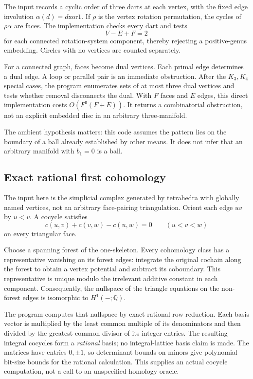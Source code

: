 \documentclass[11pt]{article}
\newcommand{\Q}{\mathbb Q}
\begin{document}
The input records a cyclic order of three darts at each vertex, with the fixed
edge involution $\alpha(d)=d\mathbin{\mathrm{xor}}1$. If $\rho$ is the vertex
rotation permutation, the cycles of $\rho\alpha$ are faces. The implementation
checks every dart and tests
\[
 V-E+F=2
\]
for each connected rotation-system component, thereby rejecting a positive-genus
embedding. Circles with no vertices are counted separately.

For a connected graph, faces become dual vertices. Each primal edge determines
a dual edge. A loop or parallel pair is an immediate obstruction. After the
$K_3,K_4$ special cases, the program enumerates sets of at most three dual
vertices and tests whether removal disconnects the dual. With $F$ faces and
$E$ edges, this direct implementation costs $O(F^3(F+E))$. It returns a
combinatorial obstruction, not an explicit embedded disc in an arbitrary
three-manifold.

The ambient hypothesis matters: this code assumes the pattern lies on the
boundary of a ball already established by other means. It does not infer that
an arbitrary manifold with $b_1=0$ is a ball.

\subsection{Exact rational first cohomology}
The input here is the simplicial complex generated by tetrahedra with globally
named vertices, not an arbitrary face-pairing triangulation. Orient each edge
$uv$ by $u<v$. A cocycle satisfies
\[
 c(u,v)+c(v,w)-c(u,w)=0\qquad(u<v<w)
\]
on every triangular face.

Choose a spanning forest of the one-skeleton. Every cohomology class has a
representative vanishing on its forest edges: integrate the original cochain
along the forest to obtain a vertex potential and subtract its coboundary.
This representative is unique modulo the irrelevant additive constant in each
component. Consequently, the nullspace of the triangle equations on the
non-forest edges is isomorphic to $H^1(-;\Q)$.

The program computes that nullspace by exact rational row reduction. Each basis
vector is multiplied by the least common multiple of its denominators and
then divided by the greatest common divisor of its integer entries. The
resulting integral cocycles form a \emph{rational} basis; no integral-lattice
basis claim is made. The matrices have entries $0,\pm1$, so determinant bounds
on minors give polynomial bit-size bounds for the rational calculation.
This supplies an actual cocycle computation, not a call to an unspecified
homology oracle.
\end{document}
